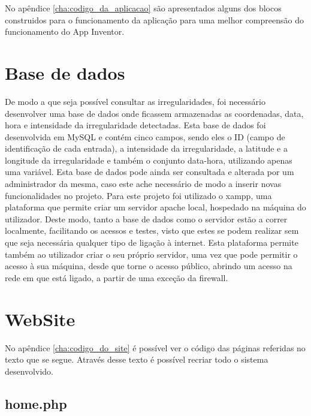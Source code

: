 No apêndice \ref{cha:codigo_da_aplicacao} são apresentados alguns dos blocos construidos para o funcionamento da aplicação para uma melhor compreensão do funcionamento do App Inventor.
\newpage

\section{Base de dados}
\label{sec:Base_de_dados}

De modo a que seja possível consultar as irregularidades, foi necessário desenvolver uma base de dados onde ficassem armazenadas as coordenadas, data, hora e intensidade da irregularidade detectadas.
Esta base de dados foi desenvolvida em MySQL e contém cinco campos, sendo eles o ID (campo de identificação de cada entrada), a intensidade da irregularidade, a latitude e a longitude da irregularidade e também o conjunto data-hora, utilizando apenas uma variável.
Esta base de dados pode ainda ser consultada e alterada por um administrador da mesma, caso este ache necessário de modo a inserir novas funcionalidades no projeto.
Para este projeto foi utilizado o xampp, uma plataforma que permite criar um servidor apache local, hospedado na máquina do utilizador.
Deste modo, tanto a base de dados como o servidor estão a correr localmente, facilitando os acessos e testes, visto que estes se podem realizar sem que seja necessária qualquer tipo de ligação à internet.
Esta plataforma permite também ao utilizador criar o seu próprio servidor, uma vez que pode permitir o acesso à sua máquina, desde que torne o acesso público, abrindo um acesso na rede em que está ligado, a partir de uma exceção da firewall.

\section{WebSite}
\label{sec:website}

No apêndice \ref{cha:codigo_do_site} é possível ver o código das páginas referidas no texto que se segue.
Através desse texto é possível recriar todo o sistema desenvolvido.

\subsection{home.php}
\label{sub:home.php}

